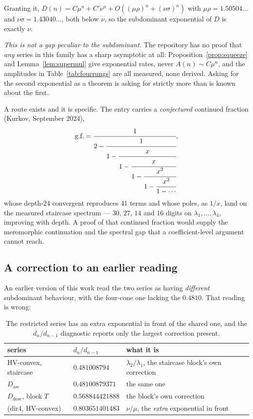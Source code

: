 \documentclass[11pt]{article}
\begin{document}
Granting it, $D(n) = C\mu^n + C'\nu^n + O((\mu\rho)^n + (\nu\sigma)^n)$ with
$\mu\rho = 1.50504\dots$ and $\nu\sigma = 1.43040\dots$, both below $\nu$, so the
subdominant exponential of $D$ is exactly $\nu$.

\emph{This is not a gap peculiar to the subdominant.} The repository has no
proof that \emph{any} series in this family has a sharp asymptotic at all:
Proposition~\ref{prop:squeeze} and Lemma~\ref{lem:supermul} give exponential
rates, never $A(n) \sim C\mu^n$, and the amplitudes in
Table~\ref{tab:fourrungs} are all measured, none derived. Asking for the second
exponential as a theorem is asking for strictly more than is known about the
first.

A route exists and it is specific. The  entry carries a
\emph{conjectured} continued fraction (Kurkov, September 2024),
\[
  \text{g.f.} = \cfrac{1}{2 - \cfrac{1}{1 - \cfrac{x}{1 - \cfrac{x}{1 - \cfrac{x^2}{1 - \cfrac{x^2}{1 - \cdots}}}}}},
\]
whose depth-$24$ convergent reproduces $41$ terms and whose poles, as $1/x$,
land on the measured staircase spectrum --- $30$, $27$, $14$ and $16$ digits on
$\lambda_1,\dots,\lambda_4$, improving with depth. A proof of that continued
fraction would supply the meromorphic continuation and the spectral gap that a
coefficient-level argument cannot reach.

\subsection{A correction to an earlier reading}

An earlier version of this work read the two series as having \emph{different}
subdominant behaviour, with the four-cone one lacking the $0.4810$. That reading is wrong:

\begin{table}[H]
\centering\small
\begin{tabular}{l l l}
\toprule
series & $d_n/d_{n-1}$ & what it is \\
\midrule
HV-convex, staircase & $0.481008794$ & $\lambda_2/\lambda_1$, the staircase block's own correction \\
$D_{\mathrm{asc}}$ & $\mathbf{0.48100879371}$ & the same one \\
$D_{\mathrm{desc}}$, block $T$ & $0.568844421888$ & the block's own correction \\
(dir4, HV-convex) & $0.803651401483$ & $\nu/\mu$, the \emph{extra} exponential in front \\
\bottomrule
\end{tabular}
\caption{The restricted series has an extra exponential in front of the shared
one, and the $d_n/d_{n-1}$ diagnostic reports only the largest correction
present.}
\label{tab:tableB}
\end{table}
\end{document}

